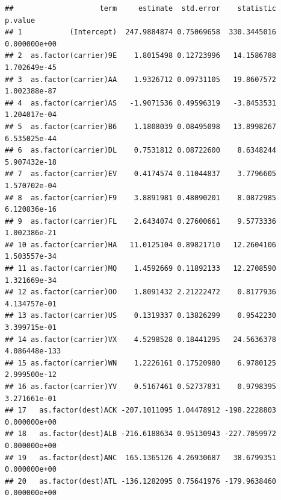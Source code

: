 \documentclass[]{book}
\theoremstyle{definition}
\theoremstyle{definition}
\theoremstyle{remark}
\begin{document}
\begin{verbatim}
##                    term     estimate  std.error    statistic       p.value
## 1           (Intercept)  247.9884874 0.75069658  330.3445016  0.000000e+00
## 2  as.factor(carrier)9E    1.8015498 0.12723996   14.1586788  1.702649e-45
## 3  as.factor(carrier)AA    1.9326712 0.09731105   19.8607572  1.002388e-87
## 4  as.factor(carrier)AS   -1.9071536 0.49596319   -3.8453531  1.204017e-04
## 5  as.factor(carrier)B6    1.1808039 0.08495098   13.8998267  6.535025e-44
## 6  as.factor(carrier)DL    0.7531812 0.08722600    8.6348244  5.907432e-18
## 7  as.factor(carrier)EV    0.4174574 0.11044837    3.7796605  1.570702e-04
## 8  as.factor(carrier)F9    3.8891981 0.48090201    8.0872985  6.120836e-16
## 9  as.factor(carrier)FL    2.6434074 0.27600661    9.5773336  1.002386e-21
## 10 as.factor(carrier)HA   11.0125104 0.89821710   12.2604106  1.503557e-34
## 11 as.factor(carrier)MQ    1.4592669 0.11892133   12.2708590  1.321669e-34
## 12 as.factor(carrier)OO    1.8091432 2.21222472    0.8177936  4.134757e-01
## 13 as.factor(carrier)US    0.1319337 0.13826299    0.9542230  3.399715e-01
## 14 as.factor(carrier)VX    4.5298528 0.18441295   24.5636378 4.086448e-133
## 15 as.factor(carrier)WN    1.2226161 0.17520980    6.9780125  2.999500e-12
## 16 as.factor(carrier)YV    0.5167461 0.52737831    0.9798395  3.271661e-01
## 17   as.factor(dest)ACK -207.1011095 1.04478912 -198.2228803  0.000000e+00
## 18   as.factor(dest)ALB -216.6188634 0.95130943 -227.7059972  0.000000e+00
## 19   as.factor(dest)ANC  165.1365126 4.26930687   38.6799351  0.000000e+00
## 20   as.factor(dest)ATL -136.1282095 0.75641976 -179.9638460  0.000000e+00
\end{verbatim}
\end{document}
